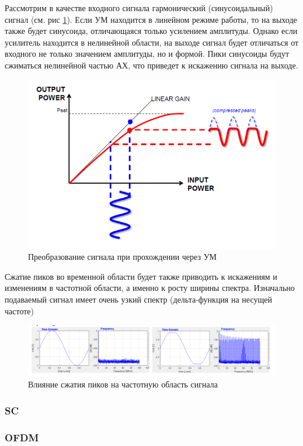 Рассмотрим в качестве входного сигнала гармонический (синусоидальный)
сигнал (см. рис \ref{fig:pa_distortion_sin}). Если УМ находится в линейном
режиме работы, то на выходе также будет синусоида, отличающаяся только
усилением амплитуды. Однако если усилитель находится в нелинейной области,
на выходе сигнал будет отличаться от входного не только значением
амплитуды, но и формой. Пики синусоиды будут сжиматься нелинейной частью
АХ, что приведет к искажению сигнала на выходе.

\begin{figure}[h!]
    \centering
    \includegraphics[width=0.7\linewidth]{figs/example_pa_signal.png}
    \caption{Преобразование сигнала при прохождении через УМ}
    \label{fig:pa_distortion_sin}
\end{figure}

Сжатие пиков во временной области будет также приводить к искажениям и 
изменениям в частотной
области, а именно к росту ширины спектра. Изначально подаваемый сигнал
имеет очень узкий спектр (дельта-функция на несущей частоте) 

\begin{figure}[h!]
    \centering
    \includegraphics[width=0.9\linewidth]{figs/pa_spectral_growth.png}
    \caption{Влияние сжатия пиков на частотную область сигнала}
    \label{fig:pa_distortion_freq}
\end{figure}

\subsubsection{SC}
\subsubsection{OFDM}
